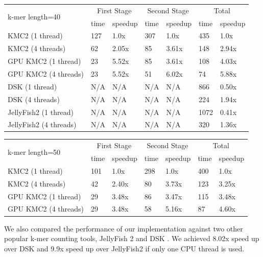 \documentclass{bioinfo}
\begin{document}
\begin{table}[H]
{\begin{tabular}{|l|l|l|l|l|l|l|}
\hline
    \multirow{2}{*}{k-mer length=40} &
      \multicolumn{2}{c}{First Stage} &
      \multicolumn{2}{c}{Second Stage} &
      \multicolumn{2}{c|}{Total} \\
    & time & speedup & time & speedup & time & speedup \\
    \hline
    KMC2 (1 thread) & 127 & 1.0x & 307 & 1.0x & 435 & 1.0x  \\
    \hline
    KMC2 (4 threads) & 62 & 2.05x & 85 & 3.61x & 148 & 2.94x \\
    \hline
    GPU KMC2 (1 thread) & 23 & 5.52x & 85 & 3.61x & 108 & 4.03x \\
    \hline
    GPU KMC2 (4 threads) & 23 & 5.52x & 51 & 6.02x & 74 & 5.88x \\
    \hline
    DSK (1 thread) & N/A & N/A & N/A & N/A & 866 & 0.50x\\
    \hline
    DSK (4 threads) & N/A & N/A & N/A & N/A & 224 & 1.94x\\
    \hline
    JellyFish2 (1 thread) & N/A & N/A & N/A & N/A & 1072 & 0.41x\\
    \hline
    JellyFish2 (4 threads) & N/A & N/A & N/A & N/A & 320 & 1.36x\\
    \hline
\end{tabular}}{}
{\begin{tabular}{|l|l|l|l|l|l|l|}
\hline
    \multirow{2}{*}{k-mer length=50} &
      \multicolumn{2}{c}{First Stage} &
      \multicolumn{2}{c}{Second Stage} &
      \multicolumn{2}{c|}{Total} \\
    & time & speedup & time & speedup & time & speedup \\
    \hline
    KMC2 (1 thread) & 101 & 1.0x & 298 & 1.0x & 400 & 1.0x  \\
    \hline
    KMC2 (4 threads) & 42 & 2.40x & 80 & 3.73x & 123 & 3.25x \\
    \hline
    GPU KMC2 (1 thread) & 29 & 3.48x & 86 & 3.47x & 115 & 3.48x \\
    \hline
    GPU KMC2 (4 threads) & 29 & 3.48x & 58 & 5.16x & 87 & 4.60x \\
    \hline
\end{tabular}}{}
\end{table}

We also compared the performance of our implementation against two other popular k-mer
counting tools, JellyFish 2 and DSK \citep{Rizk13}.
We achieved 8.02x speed up over DSK and 9.9x speed up over JellyFish2 if only one CPU
thread is used.
\end{document}
